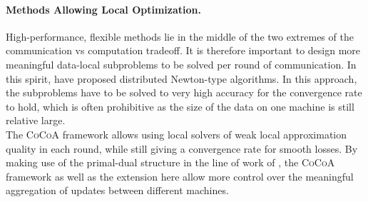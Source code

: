 \documentclass{article}
\newcommand{\cocoa}{\textsc{CoCoA}\xspace}
\newcommand{\0}{ {\bf 0}}
\theoremstyle{plain}
\theoremstyle{definition}
\begin{document}
{\vspace{-1em}
\paragraph{Methods Allowing Local Optimization.}
High-performance, flexible methods lie in the middle of the two extremes of the communication vs computation tradeoff.
It is therefore important to design more meaningful data-local subproblems to be solved per round of communication. 
In this spirit, \cite{DANE,DISCO} have proposed distributed Newton-type algorithms. In this approach, the subproblems have to be solved to very high accuracy for the convergence rate to hold, which is often prohibitive as the size of the data on one machine is still relative large.\\
%
The \cocoa framework \cite{jaggi2014communication} allows using local solvers of weak local approximation quality in each round, while still giving a convergence rate for smooth losses.
By making use of the primal-dual structure in the line of work of \cite{Yu:2012fp,Pechyony:2011wi,Yang:2013vl,Yang:2013ui,jaggi2014communication,Lee:2015vr}, the \cocoa framework as well as the extension here allow more control over the meaningful aggregation of updates between different machines.

\newcommand{\smalltrimfig}[1]{\subfigure{\texttt{[image: \#1]}}}

}
\end{document}
